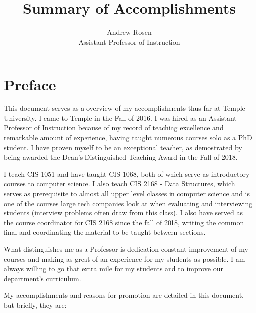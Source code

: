\documentclass[10pt]{article}
\title{Summary of Accomplishments}
\author{Andrew Rosen\\Assistant Professor of Instruction}
\begin{document}
\maketitle


\section{Preface}
This document serves as a overview of my accomplishments thus far at Temple University.  
I came to Temple in the Fall of 2016.
I was hired as an Assistant Professor of Instruction because of my record of teaching excellence and remarkable amount of experience, having taught numerous courses solo as a PhD student.
I have proven myself to be an exceptional teacher, as demostrated by being awarded the Dean's Distinguished Teaching Award in the Fall of 2018.

I teach CIS 1051 and  have taught CIS 1068, both of which serve as introductory courses to computer science.
I also teach CIS 2168 - Data Structures,  which serves as prerequisite to almost all upper level classes in computer science and is one of the courses large tech companies look at when evaluating and interviewing students (interview problems often draw from this class).  
I also have served as the course coordinator for CIS 2168 since the fall of 2018, writing the common final and coordinating the material to be taught between sections.

What distinguishes me as a Professor is dedication constant improvement of my courses and making as great of an experience for my students as possible.
I am always willing to go that extra mile for my students and to improve our department's curriculum.



My accomplishments and reasons for promotion are detailed in this document, but briefly, they are:
\end{document}

